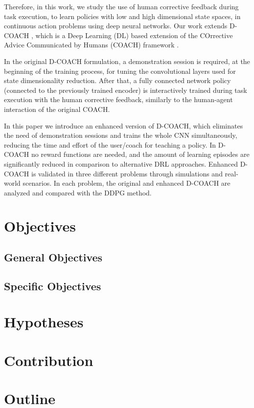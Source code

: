 \begin{intro}
Therefore, in this work, we study the use of human corrective feedback during task execution, to learn policies with low and high dimensional state spaces, in continuous action problems using deep neural networks. Our work extends D-COACH \cite{perez2018interactive}, which is a Deep Learning (DL) based extension of the COrrective Advice Communicated by Humans (COACH) framework \cite{Celemin2018AnInteractive}. 

In the original D-COACH formulation, a demonstration session is required, at the beginning of the training process, for tuning the convolutional layers used for state dimensionality reduction. After that, a fully connected network policy (connected to the previously trained encoder) is interactively trained during task execution with the human corrective feedback, similarly to the human-agent interaction of the original COACH.

In this paper we introduce an enhanced version of D-COACH, which eliminates the need of demonstration sessions and trains the whole CNN simultaneously, reducing the time and effort of the user/coach for teaching a policy.  In D-COACH no reward functions are needed, and the amount of learning episodes are significantly reduced in comparison to alternative DRL approaches. Enhanced D-COACH is validated in three different problems through simulations and real-world scenarios. In each problem, %
the original and enhanced D-COACH are analyzed and compared with the DDPG method. 


\section{Objectives}
\subsection{General Objectives}
\subsection{Specific Objectives}
\section{Hypotheses}
\section{Contribution}
\section{Outline}
\end{intro}